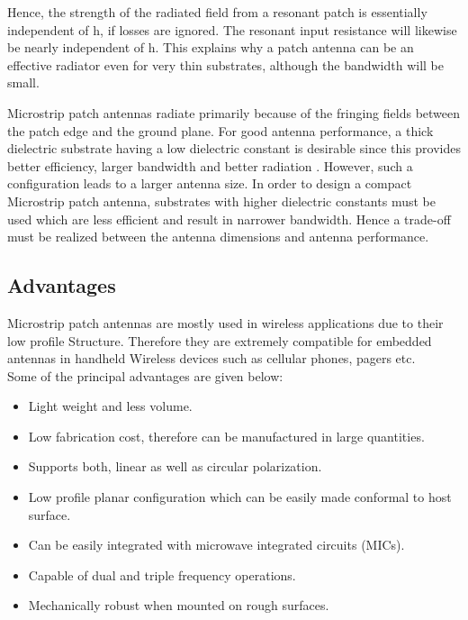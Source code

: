 \documentclass[12pt]{article}
\begin{document}
					                 Hence,  the  strength  of  the  radiated  field  from  a resonant patch is  essentially independent  of  h,  if  losses are ignored. The resonant input resistance will  likewise  be  nearly  independent  of  h.  This  explains  why  a  patch  antenna  can  be  an  effective radiator even for very thin substrates, although the bandwidth will be small.
					                 
					                 Microstrip patch antennas radiate primarily because of the fringing fields between the patch edge and the ground plane. For good antenna performance, a thick dielectric substrate having a low dielectric constant is desirable since this provides better efficiency, larger bandwidth and better radiation . However, such a configuration leads to a larger antenna size. In order to design a compact Microstrip patch antenna, substrates with higher dielectric constants must be used which are less efficient and result in narrower bandwidth. Hence a trade-off must be realized between the antenna dimensions and antenna performance.
					                 
					                 \subsection{Advantages }
					                  \justify
						                  Microstrip patch antennas are mostly used in wireless applications due to their low profile Structure. Therefore they are extremely compatible for embedded antennas in handheld Wireless devices such as cellular phones, pagers etc.
						                  \\
						                  Some of the principal advantages are given below:
						                  
						                  \begin{itemize}
						                  	\item Light weight and less volume.
						                  	\item Low fabrication cost, therefore can be manufactured in large quantities.
						                  	\item Supports both, linear as well as circular polarization.
						                  	\item Low profile planar configuration which can be easily made conformal to host surface.
						                  	\item Can be easily integrated with microwave integrated circuits (MICs).
						                  	\item Capable of dual and triple frequency operations.
						                  	\item Mechanically robust when mounted on rough surfaces. 
						                  \end{itemize}
						                  
\end{document}
